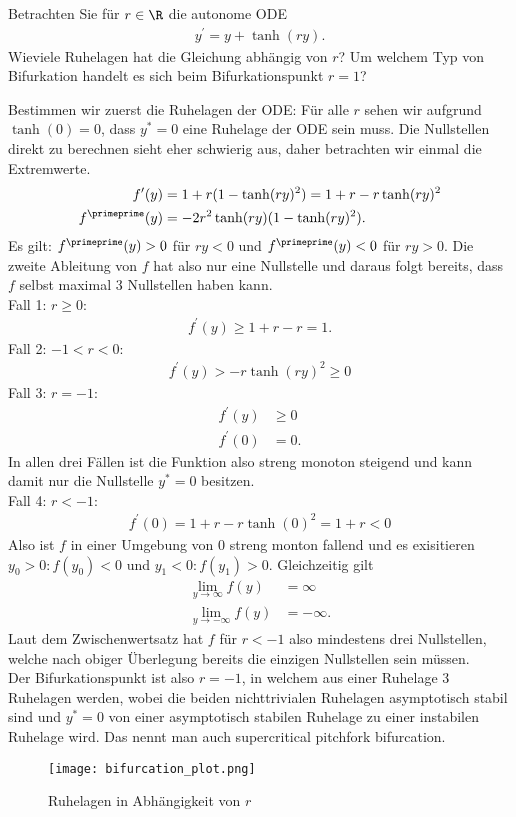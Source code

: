 \begin{exercise}
Betrachten Sie für $r \in \R$ die autonome ODE
\begin{align*}
  y^{\prime} = y + \tanh(ry).
\end{align*}
Wieviele Ruhelagen hat die Gleichung abhängig von $r$? Um welchem Typ von Bifurkation
handelt es sich beim Bifurkationspunkt $r = 1$?
\end{exercise}
\begin{solution}
Bestimmen wir zuerst die Ruhelagen der ODE:
Für alle $r$ sehen wir aufgrund $\tanh(0) = 0$, dass $y^* = 0$ eine Ruhelage der ODE
sein muss.
Die Nullstellen direkt zu berechnen sieht eher schwierig aus, daher betrachten wir
einmal die Extremwerte.
\begin{align*}
  f^{\prime}(y) &= 1 + r(1 - \tanh(ry)^2) = 1 + r - r\tanh(ry)^2 \\
  f^{\primeprime}(y) &= -2r^2\tanh(ry)(1 - \tanh(ry)^2).
\end{align*}
Es gilt: $f^{\primeprime}(y) > 0$ für $ry < 0$ und $f^{\primeprime}(y) < 0$ für $ry > 0$.
Die zweite Ableitung von $f$ hat also nur eine Nullstelle und daraus folgt bereits, dass
$f$ selbst maximal 3 Nullstellen haben kann.\\
Fall 1: $r \geq 0:$
\begin{align*}
  f^{\prime}(y) \geq 1 + r - r = 1.
\end{align*}
Fall 2: $-1 < r < 0$:
\begin{align*}
  f^{\prime}(y) > -r\tanh(ry)^2 \geq 0
\end{align*}
Fall 3: $r = -1$:
\begin{align*}
  f^{\prime}(y) &\geq 0 \\
  f^{\prime}(0) &= 0.
\end{align*}
In allen drei Fällen ist die Funktion also streng monoton steigend und kann damit
nur die Nullstelle $y^* = 0$ besitzen. \\
Fall 4: $r < -1$:
\begin{align*}
  f^{\prime}(0) = 1 + r - r\tanh(0)^2 = 1 + r < 0
\end{align*}
Also ist $f$ in einer Umgebung von $0$ streng monton fallend und es exisitieren
$y_0 > 0: f(y_0) < 0$ und $y_1 < 0: f(y_1) > 0$. Gleichzeitig gilt
\begin{align*}
  \lim_{y \to \infty} f(y) &= \infty \\
  \lim_{y \to -\infty} f(y) &= -\infty.
\end{align*}
Laut dem Zwischenwertsatz hat $f$ für $r < -1$ also mindestens drei Nullstellen,
welche nach obiger Überlegung bereits die einzigen Nullstellen sein müssen. \\
Der Bifurkationspunkt ist also $r = -1$, in welchem aus einer Ruhelage 3 Ruhelagen werden,
wobei die beiden nichttrivialen Ruhelagen asymptotisch stabil sind und $y^* = 0$
von einer asymptotisch stabilen Ruhelage zu einer instabilen Ruhelage wird.
Das nennt man auch \glqq supercritical pitchfork bifurcation\grqq. \\

\begin{figure}
    \centering
    \texttt{[image: bifurcation\_plot.png]}
    \caption{Ruhelagen in Abhängigkeit von $r$}
\end{figure}
\end{solution}
